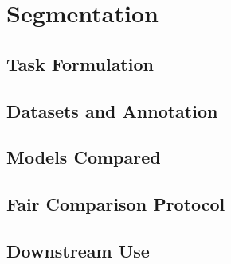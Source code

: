 \chapter{Segmentation}
\label{chap:segmentation}

\section{Task Formulation}
\label{sec:seg-task}

\section{Datasets and Annotation}
\label{sec:seg-datasets}

\section{Models Compared}
\label{sec:seg-models}

\section{Fair Comparison Protocol}
\label{sec:seg-protocol}

\section{Downstream Use}
\label{sec:seg-downstream}
